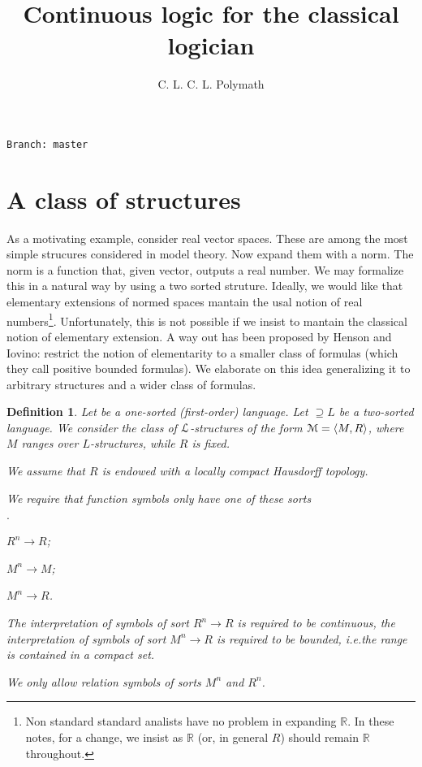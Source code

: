 \documentclass[12pt,letterpaper,oneside,reqno]{amsart}
\author{C. L. C. L. Polymath}
\newcommand{\mylabel}[1]{{#1}\hfill}
\renewenvironment{itemize}
  {\begin{list}{$\cdot$}{%
   \setlength{\parskip}{0mm}
   \setlength{\topsep}{.2\baselineskip}
   \setlength{\rightmargin}{0mm}
   \setlength{\listparindent}{0mm}
   \setlength{\itemindent}{0mm}
   \setlength{\labelwidth}{3ex}
   \setlength{\itemsep}{.2\baselineskip}
   \setlength{\parsep}{.2\baselineskip}
   \setlength{\partopsep}{0mm}
   \setlength{\labelsep}{1ex}
   \setlength{\leftmargin}{\labelwidth+\labelsep}
   \let\makelabel\mylabel}}{%
   \end{list}}
\theoremstyle{plain}
\newtheorem{definition}[theorem]{Definition}
\theoremstyle{remark}
\renewcommand*{\emph}[1]{%
   \smash{\tikz[baseline]\node[rectangle, fill=olive!25, rounded corners, inner xsep=0.5ex, inner ysep=0.2ex, anchor=base, minimum height = 2.7ex]{#1};}}
\begin{document}
\title{Continuous logic for the classical logician}
\hfill\texttt{Branch:\ master\ \DTMnow}\bigskip
\maketitle
\raggedbottom




\section{A class of structures}\label{uno}


\def\ceq#1#2#3{\parbox[t]{23ex}{$\displaystyle #1$}\parbox{6ex}{\hfil $#2$}{$\displaystyle #3$}}

As a motivating example, consider real vector spaces.
These are among the most simple strucures considered in model theory.
Now expand them with a norm.
The norm is a function that, given vector, outputs a real number.
We may formalize this in a natural way by using a two sorted struture.
Ideally, we would like that elementary extensions of normed spaces mantain the usal notion of real numbers\footnote{Non standard standard analists have no problem in expanding $\mathds{R}$. In these notes, for a change, we insist as $\mathds{R}$ (or, in general $R$) should remain $\mathds{R}$ throughout.}. Unfortunately, this is not possible if we insist to mantain the classical notion of elementary extension.
A way out has been proposed by Henson and Iovino: restrict the notion of elementarity to a smaller class of formulas (which they call positive bounded formulas).
We elaborate on this idea generalizing it to arbitrary structures and a wider class of formulas.

\begin{definition}\label{def_0}
  Let \emph{$L$\/} be a one-sorted (first-order) language.
  Let \emph{${\EuScript L}$\/}$\supseteq L$ be a two-sorted language.
  We consider the class of ${\EuScript L}$-structures of the form ${\EuScript M}=\langle  M,R\rangle$, where $M$ ranges over $L$-structures, while $R$ is fixed.

  We assume that $R$ is endowed with a locally compact Hausdorff topology.

  We require that function symbols only have one of these sorts
  \begin{itemize}
    \item[i.] $R^n\to R$;
    \item[ii.] $M^n\to M$;
    \item[iii.] $M^n\to R$.
  \end{itemize}
  The interpretation of symbols of sort $R^n\to R$ is required to be continuous, the interpretation of symbols of sort $M^n\to R$ is required to be bounded, i.e.\@ the range is contained in a compact set.

  We only allow relation symbols of sorts $M^n$ and $R^n$.
\end{definition}
\end{document}
